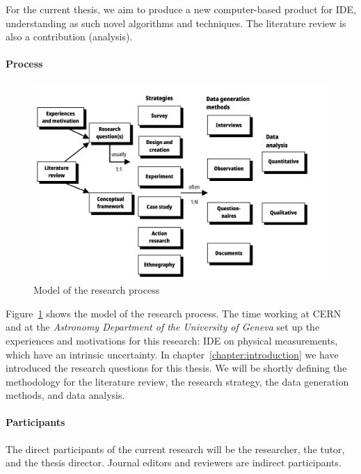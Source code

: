 For the current thesis, we aim to produce a new computer-based product
for \gls{IDE}, understanding as such novel algorithms and techniques.
The literature review is also a contribution (analysis).

\paragraph{Process}
\label{method:process}

\begin{figure}[htpb]
  \centering
  \includegraphics[width=\linewidth]{images/2_methodology/modelo_proceso}
  \caption[Model of the research process]{Model of the research process~\cite{Oates2006}}
  \label{fig:method_process_model}
\end{figure}

Figure~\ref{fig:method_process_model} shows the model of the research process.
The time working at \gls{CERN} and at the \emph{Astronomy Department of the University of Geneva}
set up the experiences and motivations for this research: \gls{IDE} on physical measurements,
which have an intrinsic uncertainty. In chapter~\ref{chapter:introduction} we have
introduced the research questions for this thesis.
We will be shortly defining the methodology for the literature review,
the research strategy, the data generation methods, and data analysis.

\paragraph{Participants}
\label{method:participants}
The direct participants of the current research will be the researcher, the tutor, and
the thesis director. Journal editors and reviewers are indirect participants.

